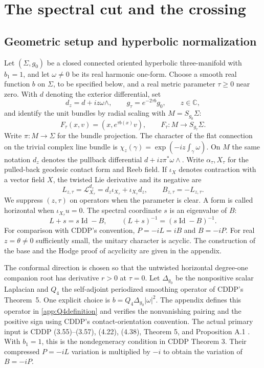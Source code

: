 \documentclass[11pt,letterpaper,reqno]{amsart}
\theoremstyle{remark}
\newcommand{\LL}{\mathcal L}
\newcommand{\Id}{\operatorname{Id}}
\begin{document}
\section{The spectral cut and the crossing}\label{sec:spectral}
\subsection{Geometric setup and hyperbolic normalization}\label{sec:geometry}
Let $(\Sigma,g_0)$ be a closed connected oriented hyperbolic
three-manifold with $b_1=1$, and let $\omega\neq0$ be its real harmonic
one-form. Choose a smooth real function $b$ on $\Sigma$, to be specified
below, and a real metric parameter $\tau\geq0$ near zero. With $d$
denoting the exterior differential, set
\[
 d_z=d+iz\omega\wedge,\qquad g_\tau=e^{-2\tau b}g_0,
 \qquad z\in\mathbb C,
\]
and identify the unit bundles by radial scaling with $M=S_{g_0}\Sigma$:
\[
 F_\tau(x,v)=(x,e^{\tau b(x)}v),\qquad
 F_\tau:M\longrightarrow S_{g_\tau}\Sigma.
\]
Write $\pi:M\to\Sigma$ for the bundle projection. The character of
the flat connection on the trivial complex line bundle is
$\chi_z(\gamma)=\exp(-iz\int_\gamma\omega)$. On $M$ the same
notation $d_z$ denotes the pullback differential
$d+iz\pi^*\omega\wedge$.
Write $\alpha_\tau,X_\tau$ for the pulled-back geodesic contact form
and Reeb field. If $\iota_X$ denotes contraction with a vector field
$X$, the twisted Lie derivative and its negative are
\[
 L_{z,\tau}=\LL^{d_z}_{X_\tau}
       =d_z\iota_{X_\tau}+\iota_{X_\tau}d_z,
 \qquad B_{z,\tau}=-L_{z,\tau}.
\]
We suppress $(z,\tau)$ on operators when the parameter is clear.
A form is called horizontal when $\iota_{X_\tau}u=0$.
The spectral coordinate $s$ is an eigenvalue of $B$:
\[
 L+s=s\Id-B,\qquad (L+s)^{-1}=(s\Id-B)^{-1}.
\]
For comparison with CDDP's convention, $P=-iL=iB$ and $B=-iP$. For real $z=\theta\neq0$ sufficiently small, the
unitary character is acyclic. The construction of the base and the Hodge proof of acyclicity
are given in the appendix.


The conformal direction is chosen so that the untwisted horizontal
degree-one companion root has derivative $r>0$ at $\tau=0$.
Let $\Delta_{g_0}$ be the nonpositive scalar Laplacian and $Q_4$ the
self-adjoint periodized smoothing operator of CDDP's Theorem~5.
One explicit choice is $b=Q_4\Delta_{g_0}|\omega|^2$. The appendix
defines this operator in \eqref{app:Q4definition} and verifies the nonvanishing pairing
and the positive sign using CDDP's contact-orientation convention.
The actual primary input is CDDP (3.55)--(3.57), (4.22), (4.38),
Theorem 5, and Proposition A.1 \cite{CDDP}. With $b_1=1$, this is
the nondegeneracy condition in CDDP Theorem 3. Their compressed
$P=-iL$ variation is multiplied by $-i$ to obtain the variation of
$B=-iP$.
\end{document}
